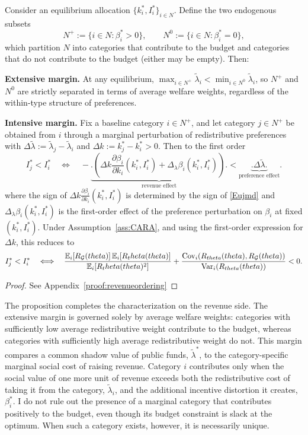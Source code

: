 \documentclass{class}
\begin{document}
\begin{proposition}\label{prop:revenueordering}
Consider an equilibrium allocation $\{k_i^\ast,I_i^\ast\}_{i\in N}$. Define the two endogenous subsets \[ N^+:=\{i\in N:\beta_i^\ast>0\}, \qquad N^0:=\{i\in N:\beta_i^\ast=0\}, \] which partition \(N\) into categories that contribute to the budget and categories that do not contribute to the budget (either may be empty). Then:

\noindent\textbf{Extensive margin.} At any equilibrium, $\max_{i \in N^+} \tilde\lambda_i < \min_{i \in N^0} \tilde\lambda_i$, so \(N^+\) and \(N^0\) are strictly separated in terms of average welfare weights, regardless of the within-type structure of preferences.

\noindent\textbf{Intensive margin.} Fix a baseline category $i \in N^+$, and let category $j \in N^+$ be obtained from $i$ through a marginal perturbation of redistributive preferences with $\Delta\tilde\lambda:=\tilde\lambda_j-\tilde\lambda_i$ and $\Delta k:=k_j^\ast-k_i^\ast>0$. Then to the first order \[ I_j^\ast<I_i^\ast \quad\Longleftrightarrow\quad -\underbrace{\Bigg.\left(\Delta k\frac{\partial \beta_i}{\partial k_i}(k_i^\ast,I_i^\ast)+\Delta_{\lambda}\beta_i(k_i^\ast,I_i^\ast)\right)\Bigg.}_{\text{revenue effect}}<\underbrace{\Bigg.\Delta\tilde\lambda\Bigg.}_{\text{preference effect}}. \] where the sign of $\Delta k \frac{\partial \beta_i}{\partial k_i}(k_i^\ast,I_i^\ast)$ is determined by the sign of \ref{Eujmd} and $\Delta_{\lambda}\beta_i(k_i^\ast,I_i^\ast)$ is the first-order effect of the preference perturbation on $\beta_i$ at fixed $(k_i^\ast,I_i^\ast)$. Under Assumption~\ref{ass:CARA}, and using the first-order expression for $\Delta k$, this reduces to \[ I_j^\ast<I_i^\ast \quad\Longleftrightarrow\quad \frac{\mathbb{E}_i[R_{\mathcal{G}}(theta)]\,\mathbb{E}_i[R_theta(theta)]}{\mathbb{E}_i[R_theta(theta)^2]}+ \frac{\mathrm{Cov}_i\!\left(R_{theta}(theta),R_{\mathcal{G}}(theta)\right)}{\mathrm{Var}_i\!\left(R_{theta}(theta)\right)} < 0. \]
\end{proposition}

\begin{proof}
    See Appendix~\ref{proof:revenueordering}
\end{proof}

The proposition completes the characterization on the revenue side. The extensive margin is governed solely by average welfare weights: categories with sufficiently low average redistributive weight contribute to the budget, whereas categories with sufficiently high average redistributive weight do not. This margin compares a common shadow value of public funds, \(\tilde\lambda^\ast\), to the category-specific marginal social cost of raising revenue. Category \(i\) contributes only when the social value of one more unit of revenue exceeds both the redistributive cost of taking it from the category, \(\tilde\lambda_i\), and the additional incentive distortion it creates, \(\beta_i^\ast\). I do not rule out the presence of a marginal category that contributes positively to the budget, even though its budget constraint is slack at the optimum. When such a category exists, however, it is necessarily unique. 
\end{document}
